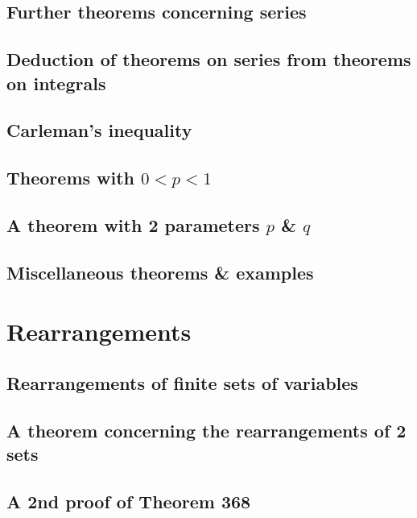 \documentclass[oneside]{book}
\numberwithin{equation}{section}
\begin{document}
\subsection{Further theorems concerning series}

\subsection{Deduction of theorems on series from theorems on integrals}

\subsection{Carleman's inequality}

\subsection{Theorems with $0 < p < 1$}

\subsection{A theorem with 2 parameters $p$ \& $q$}

\subsection{Miscellaneous theorems \& examples}


\section{Rearrangements}

\subsection{Rearrangements of finite sets of variables}

\subsection{A theorem concerning the rearrangements of 2 sets}

\subsection{A 2nd proof of Theorem 368}
\end{document}

